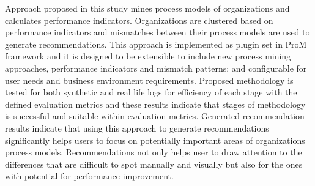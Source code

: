 Approach proposed in this study mines process models of organizations and calculates performance indicators. Organizations are clustered based on performance indicators and mismatches between their process models are used to generate recommendations. This approach is implemented as plugin set in ProM framework and it is designed to be extensible to include new process mining approaches, performance indicators and mismatch patterns; and configurable for user needs and business environment requirements. Proposed methodology is tested for both synthetic and real life logs for efficiency of each stage with the defined evaluation metrics and these results indicate that stages of methodology is successful and suitable within evaluation metrics. Generated recommendation results indicate that using this approach to generate recommendations significantly helps users to focus on potentially important areas of organizations process models. Recommendations not only helps user to draw attention to the differences that are difficult to spot manually and visually but also for the ones with potential for performance improvement.  
